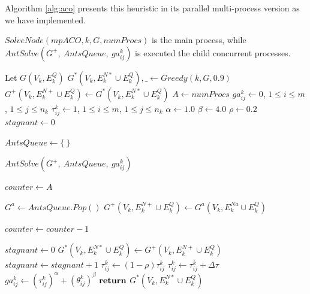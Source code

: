 \documentclass[preprint,authoryear]{elsarticle}
\begin{document}
Algorithm \ref{alg:aco} presents this heuristic in its parallel multi-process version as we have implemented.

$SolveNode(mpACO, k, G, numProcs)$ is the main process, while $AntSolve(G^+,\ AntsQueue,\ ga^k_{ij})$ is executed the child concurrent processes.

\begin{algorithm}[H] 
	
	
	\caption{ $SolveNode(mpACO, k, G, numProcs)$ } \label{alg:aco}
	\begin{algorithmic}[1]
		\State Let $G(V_k, E^Q_k)$ 
		\State $G^*(V_k, E^{N*}_k \cup E^Q_k), \_ \gets Greedy(k, G, 0.9)$  \label{aco:greedy} 
		\State $G^+(V_k, E^{N+}_k \cup E^Q_k) \gets G^*(V_k,E^{N*}_k \cup E^Q_k)$
		\State $A \gets numProcs$ \label{aco:numProcs}
		\State $ga^k_{ij}   \gets 0$, $1 \leq i \leq m$, $1 \leq j \leq n_k$  \label{aco:init1}
		\State $\tau^k_{ij} \gets 1$, $1 \leq i \leq m$, $1 \leq j \leq n_k$   \label{aco:init2}
		\State $\alpha    \gets 1.0$ \label{aco:alpha}
		\State $\beta     \gets 4.0$ \label{aco:beta}
		\State $\rho      \gets 0.2$ \label{aco:rho}
		\State $stagnant \gets 0$
		 \label{aco:while}
					
			\State $AntsQueue \gets \{\ \}$ \label{aco:AntsQueue}

			 \label{aco:AntsSolve}	
				\State $AntSolve(G^+,\ AntsQueue,\ ga^k_{ij})$
			\EndFor
			
			\State $counter \gets A$
						
			 \label{aco:while2}
			
				\State $G^{a} \gets AntsQueue.Pop()$	
					\State $G^+(V_k, E^{N+}_k \cup E^Q_k) \gets G^a(V_k, E^{Na}_k \cup E^Q_k)$ 
				\EndIf
				
				\State $counter \gets counter - 1$
												
			\EndWhile			
									
			 \label{aco:best1}
				\State $stagnant \gets 0$
				\State $G^*(V_k, E^{N*}_k \cup E^Q_k) \gets G^+(V_k, E^{N+}_k \cup E^Q_k)$		
			\Else
				\State $stagnant \gets stagnant + 1$ 
			\EndIf
				\State $\tau^k_{ij} \gets (1-\rho)\tau^k_{ij}$ \label{aco:rho2}
				\State $\tau^k_{ij} \gets \tau^k_{ij} + \Delta\tau$ \label{aco:phero2}
				\State $ga^k_{ij} \gets (\tau^k_{ij})^\alpha + (\theta^k_{ij})^\beta$ \label{aco:ga2}				
			\EndFor	
		\EndWhile	
		\State ${\bf return}$ $G^*(V_k, E^{N*}_k \cup E^Q_k)$		
	\end{algorithmic}
\end{algorithm}
	
\end{document}
